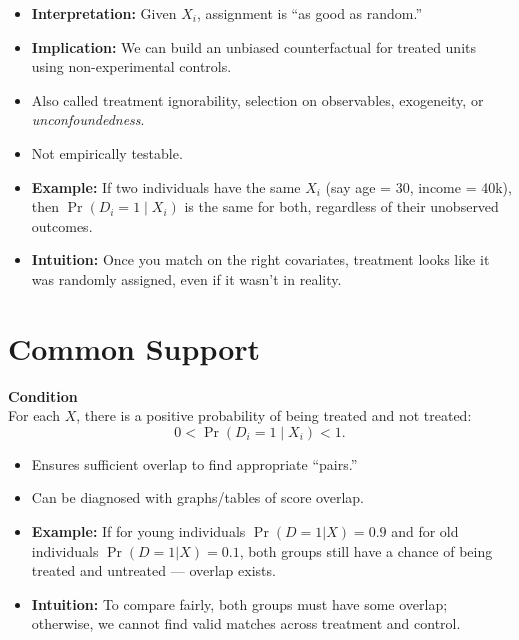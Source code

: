 \documentclass[12pt]{article}
\begin{document}
\begin{itemize}
    \item \textbf{Interpretation:} Given $X_i$, assignment is “as good as random.”
    \item \textbf{Implication:} We can build an unbiased counterfactual for treated units using non-experimental controls.
    \item Also called treatment ignorability, selection on observables, exogeneity, or \textit{unconfoundedness}.
    \item Not empirically testable.
\end{itemize}

\begin{itemize}
    \item \textbf{Example:} If two individuals have the same $X_i$ (say age = 30, income = 40k), then $\Pr(D_i=1 \mid X_i)$ is the same for both, regardless of their unobserved outcomes.
    \item \textbf{Intuition:} Once you match on the right covariates, treatment looks like it was randomly assigned, even if it wasn’t in reality.
\end{itemize}

\section*{\noindent\textbf{Common Support}}

\textbf{Condition} \\
For each $X$, there is a positive probability of being treated and not treated:
\[
0 < \Pr(D_i = 1 \mid X_i) < 1.
\]

\begin{itemize}
    \item Ensures sufficient overlap to find appropriate “pairs.”
    \item Can be diagnosed with graphs/tables of score overlap.
\end{itemize}

\begin{itemize}
    \item \textbf{Example:} If for young individuals $\Pr(D=1|X)=0.9$ and for old individuals $\Pr(D=1|X)=0.1$, both groups still have a chance of being treated and untreated — overlap exists.
    \item \textbf{Intuition:} To compare fairly, both groups must have some overlap; otherwise, we cannot find valid matches across treatment and control.
\end{itemize}
\end{document}
